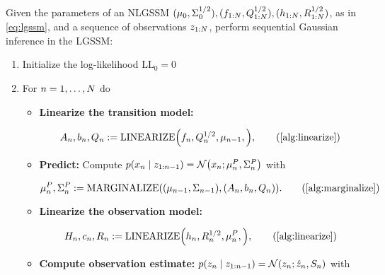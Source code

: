 \documentclass{mimosis}
\begin{document}
\begin{alg}
\setlength{\belowdisplayskip}{3pt}
\setlength{\belowdisplayshortskip}{2pt}
\setlength{\abovedisplayskip}{3pt}
\setlength{\abovedisplayshortskip}{-8pt}
\label{alg:nlgssm-inference}
\label{alg:nlgssm-inference:local}
Given the parameters of an NLGSSM
\((\mu_{0}, \Sigma_{0}^{1/2}), (f_{1:N}, Q_{1:N}^{1/2}), (h_{1:N}, R_{1:N}^{1/2})\),
as in \cref{eq:lgssm},
and a sequence of observations \(z_{1:N}\),
perform sequential Gaussian inference in the LGSSM:
\begin{enumerate}[nosep]
\item Initialize the log-likelihood \(\text{LL}_0 = 0\)
\item For \(n = 1, \dots, N\) do
\begin{itemize}
\item \textbf{Linearize the transition model:}
\begin{fleqn}
\begin{equation*}
  \transA_\idxt, \transb_\idxt, \transC_\idxt := \operatorname{LINEARIZE}\left(
    \transf_\idxt, \transC_\idxt^{1/2}, \mean{{\idxt-1}},
  \right),
  \tag{\cref{alg:linearize}}
\end{equation*}
\end{fleqn}
\item \textbf{Predict:} Compute
\(\p(\st_\idxt \mid \obs_{1:\idxt-1}) = \N( \st_\idxt; \mean{\idxt}^P, \cov{\idxt}^P )\) with
\begin{fleqn}
\begin{equation}
  \mean{\idxt}^P, \cov{\idxt}^P := \operatorname{MARGINALIZE}\left(
    (\mean{{\idxt-1}}, \cov{{\idxt-1}}),
    (\transA_\idxt, \transb_\idxt, \transC_\idxt)
  \right).
  \tag{\cref{alg:marginalize}}
\end{equation}
\end{fleqn}
\item \textbf{Linearize the observation model:}
\begin{fleqn}
\begin{equation*}
 \obsA_\idxt, \obsb_\idxt, \obsC_\idxt := \operatorname{LINEARIZE}\left(
   \obsh_\idxt, \obsC_\idxt^{1/2}, \mean{\idxt}^P,
  \right),
  \tag{\cref{alg:linearize}}
\end{equation*}
\end{fleqn}
\item \textbf{Compute observation estimate:}
\(\p(\obs_\idxt \mid \obs_{1:\idxt-1}) = \N( \obs_\idxt; \hat{\obs}_\idxt, S_\idxt )\)
with

\end{itemize}
\end{enumerate}
\end{alg}
\end{document}
